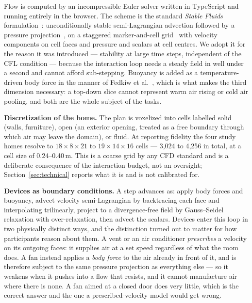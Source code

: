\documentclass[manuscript,review,anonymous]{acmart}
\begin{document}
Flow is computed by an incompressible Euler solver written in TypeScript and
running entirely in the browser. The scheme is the standard \emph{Stable Fluids}
formulation~\cite{stam1999stable}: unconditionally stable semi-Lagrangian
advection followed by a pressure projection~\cite{chorin1968projection}, on a
staggered marker-and-cell grid~\cite{harlow1965mac} with velocity components on
cell faces and pressure and scalars at cell centres. We adopt it for the reason
it was introduced --- stability at large time steps, independent of the CFL
condition --- because the interaction loop needs a steady field in well under a
second and cannot afford sub-stepping. Buoyancy is added as a temperature-driven
body force in the manner of Fedkiw et al.~\cite{fedkiw2001visual}, which is what
makes the third dimension necessary: a top-down slice cannot represent warm air
rising or cold air pooling, and both are the whole subject of the tasks.

\textbf{Discretization of the home.} The plan is voxelized into cells labelled
solid (walls, furniture), open (an exterior opening, treated as a free boundary
through which air may leave the domain), or fluid. At reporting fidelity the
four study homes resolve to $18{\times}8{\times}21$ to $19{\times}14{\times}16$
cells --- 3{,}024 to 4{,}256 in total, at a cell size of 0.24--0.40\,m. This is
a coarse grid by any CFD standard and is a deliberate consequence of the
interaction budget, not an oversight; Section~\ref{sec:technical} reports what
it is and is not calibrated for.

\textbf{Devices as boundary conditions.} A step advances as: apply body forces
and buoyancy, advect velocity semi-Lagrangian by backtracing each face and
interpolating trilinearly, project to a divergence-free field by Gauss--Seidel
relaxation with over-relaxation, then advect the scalars. Devices enter this
loop in two physically distinct ways, and the distinction turned out to matter
for how participants reason about them. A vent or an air conditioner
\emph{prescribes} a velocity on its outgoing faces: it supplies air at a set
speed regardless of what the room does. A fan instead applies a \emph{body
force} to the air already in front of it, and is therefore subject to the same
pressure projection as everything else --- so it weakens when it pushes into a
flow that resists, and it cannot manufacture air where there is none. A fan
aimed at a closed door does very little, which is the correct answer and the one
a prescribed-velocity model would get wrong.
\end{document}

